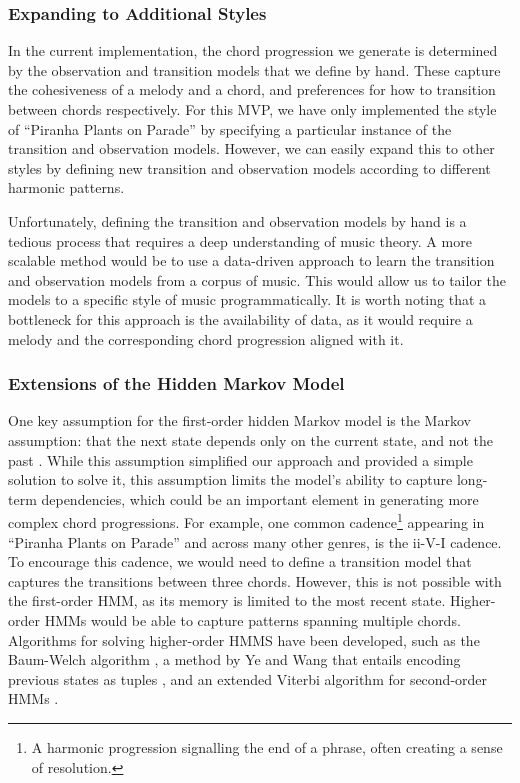 \subsubsection{Expanding to Additional Styles}

In the current implementation, the chord progression we generate is determined by the observation and transition models that we define by hand. These capture the cohesiveness of a melody and a chord, and preferences for how to transition between chords respectively. For this MVP, we have only implemented the style of ``Piranha Plants on Parade'' by specifying a particular instance of the transition and observation models. However, we can easily expand this to other styles by defining new transition and observation models according to different harmonic patterns.

Unfortunately, defining the transition and observation models by hand is a tedious process that requires a deep understanding of music theory. A more scalable method would be to use a data-driven approach to learn the transition and observation models from a corpus of music. This would allow us to tailor the models to a specific style of music programmatically. It is worth noting that a bottleneck for this approach is the availability of data, as it would require a melody and the corresponding chord progression aligned with it.

\subsubsection{Extensions of the Hidden Markov Model}

One key assumption for the first-order hidden Markov model is the Markov assumption: that the next state depends only on the current state, and not the past \autocite{SpeechLang:2025}. While this assumption simplified our approach and provided a simple solution to solve it, this assumption limits the model's ability to capture long-term dependencies, which could be an important element in generating more complex chord progressions. For example, one common cadence\footnote{A harmonic progression signalling the end of a phrase, often creating a sense of resolution.} appearing in ``Piranha Plants on Parade'' and across many other genres, is the ii-V-I cadence. To encourage this cadence, we would need to define a transition model that captures the transitions between three chords. However, this is not possible with the first-order HMM, as its memory is limited to the most recent state. Higher-order HMMs would be able to capture patterns spanning multiple chords. Algorithms for solving higher-order HMMS have been developed, such as the Baum-Welch algorithm \autocite{BaumWelch:1970}, a method by Ye and Wang that entails encoding previous states as tuples \autocite{DecodeHMM:2014}, and an extended Viterbi algorithm for second-order HMMs \autocite{Viterbi2:1988}.

